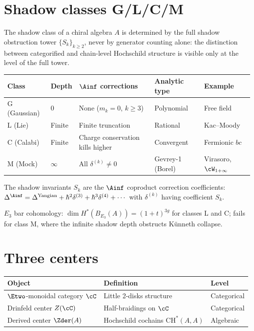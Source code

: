 \section{Shadow classes G/L/C/M}
\label{sec:notation-shadow}

The shadow class of a chiral algebra $A$ is determined by the full shadow
obstruction tower $\{S_k\}_{k \ge 2}$, never by generator counting alone:
the distinction between categorified and chain-level Hochschild
structure is visible only at the level of the full tower.

\begin{center}
\begin{tabular}{@{}lllll@{}}
\toprule
\textbf{Class} & \textbf{Depth} & \textbf{$\Ainf$ corrections} & \textbf{Analytic type} & \textbf{Example} \\
\midrule
G (Gaussian) & 0 & None ($m_k = 0$, $k \ge 3$) & Polynomial & Free field \\
L (Lie) & Finite & Finite truncation & Rational & Kac--Moody \\
C (Calabi) & Finite & Charge conservation kills higher & Convergent & Fermionic $bc$ \\
M (Mock) & $\infty$ & All $\delta^{(k)} \neq 0$ & Gevrey-1 (Borel) & Virasoro, $\cW_{1+\infty}$ \\
\bottomrule
\end{tabular}
\end{center}

\noindent
The shadow invariants $S_k$ are the $\Ainf$ coproduct correction coefficients:
$\Delta^{\Ainf} = \Delta^{\mathrm{Yangian}} + \hbar^2 \delta^{(3)} + \hbar^3 \delta^{(4)} + \cdots$
with $\delta^{(k)}$ having coefficient $S_k$.

$E_3$ bar cohomology: $\dim H^*(B_{E_3}(A)) = (1+t)^{3g}$ for classes L and C;
fails for class M, where the infinite shadow depth obstructs K\"unneth
collapse.

\section{Three centers}
\label{sec:notation-centers}

\begin{center}
\begin{tabular}{@{}lll@{}}
\toprule
\textbf{Object} & \textbf{Definition} & \textbf{Level} \\
\midrule
$\Etwo$-monoidal category $\cC$ & Little 2-disks structure & Categorical \\
Drinfeld center $Z(\cC)$ & Half-braidings on $\cC$ & Categorical \\
Derived center $\Zder(A)$ & Hochschild cochains $\mathrm{CH}^*(A,A)$ & Algebraic \\
\bottomrule
\end{tabular}
\end{center}

